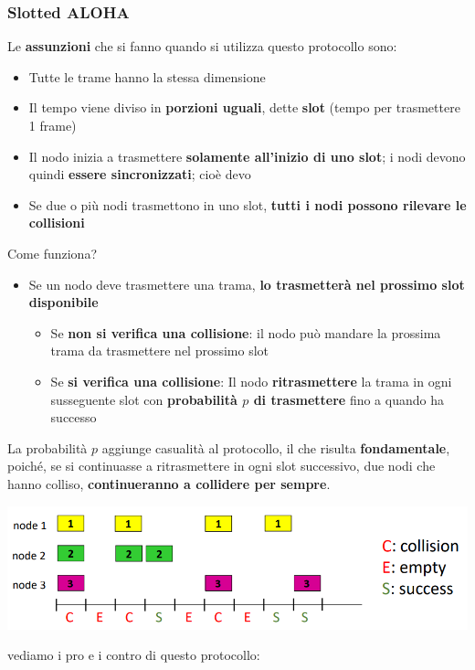 \documentclass[12pt]{article}
\begin{document}
\subsubsection{Slotted ALOHA}
Le \textbf{assunzioni} che si fanno quando si utilizza questo protocollo sono:
\begin{itemize}
    \item Tutte le trame hanno la stessa dimensione
    \item Il tempo viene diviso in \textbf{porzioni uguali}, dette \textbf{slot} (tempo per trasmettere 1 frame)
    \item Il nodo inizia a trasmettere \textbf{solamente all'inizio di uno slot}; i nodi devono quindi \textbf{essere sincronizzati}; cioè devo
    \item Se due o più nodi trasmettono in uno slot, \textbf{tutti i nodi possono rilevare le collisioni}
\end{itemize}
Come funziona?
\begin{itemize}
    \item Se un nodo deve trasmettere una trama, \textbf{lo trasmetterà nel prossimo slot disponibile}
    \begin{itemize}
        \item Se \textbf{non si verifica una collisione}: il nodo può mandare la prossima trama da trasmettere nel prossimo slot
        \item Se \textbf{si verifica una collisione}: Il nodo \textbf{ritrasmettere} la trama in ogni susseguente slot con \textbf{probabilità $p$ di trasmettere} fino a quando ha successo
    \end{itemize}
\end{itemize}
La probabilità $p$ aggiunge casualità al protocollo, il che risulta \textbf{fondamentale}, poiché, se si continuasse a ritrasmettere in ogni slot successivo,
due nodi che hanno colliso, \textbf{continueranno a collidere per sempre}. 
\begin{center}
    \includegraphics[width =0.95\linewidth]{Images/120.png}
\end{center}
vediamo i pro e i contro di questo protocollo:
\end{document}

